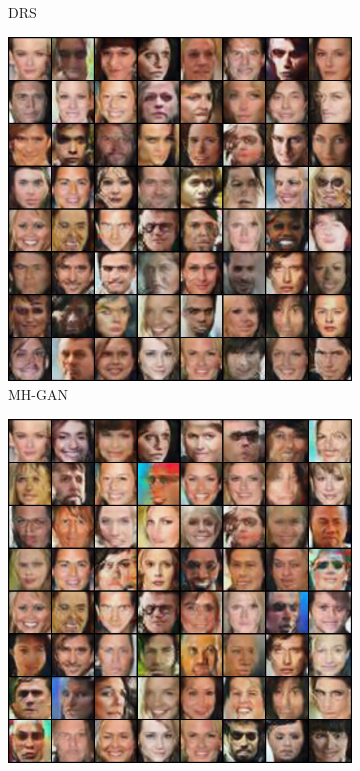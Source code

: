\begin{figure}[htbp]
\begin{subfigure}[b]{0.49\textwidth}
       \caption{DRS}
    \end{subfigure}
    \begin{subfigure}[b]{0.49\textwidth}
       \centering
       \includegraphics[width=\exfactor\textwidth]{figures/celeba/31_base_raw_MH.png}
       \caption{MH-GAN}
    \end{subfigure}
    \begin{subfigure}[b]{0.49\textwidth}
       \centering
       \includegraphics[width=\exfactor\textwidth]{figures/celeba/31_base_iso_MH.png}

\end{subfigure}
\end{figure}
